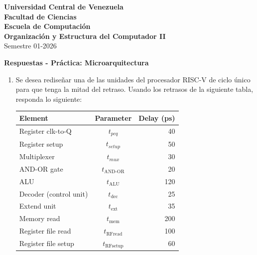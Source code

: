 \documentclass[letterpaper,12pt]{article}
\begin{document}

\noindent \textbf{Universidad Central de Venezuela}\\
\textbf{Facultad de Ciencias}\\
\textbf{Escuela de Computación}\\
\textbf{Organización y Estructura del Computador II}\\
Semestre 01-2026

\vspace{0.3cm}
\begin{center}
{\textbf{Respuestas - Práctica: Microarquitectura}}
\end{center}
\vspace{0.5cm}


\begin{enumerate}

    \item Se desea rediseñar una de las unidades del procesador RISC-V de ciclo único para que tenga la mitad del retraso. Usando los retrasos de la siguiente tabla, responda lo siguiente:

    \begin{center}
        \small
        \begin{tabular}{|l|c|r|}
            \hline
            \textbf{Element} & \textbf{Parameter} & \textbf{Delay (ps)} \\
            \hline
            Register clk-to-Q & $t_{pcq}$ & 40 \\
            Register setup & $t_{setup}$ & 50 \\
            Multiplexer & $t_{mux}$ & 30 \\
            AND-OR gate & $t_{\text{AND-OR}}$ & 20 \\
            ALU & $t_{\text{ALU}}$ & 120 \\
            Decoder (control unit) & $t_{\text{dec}}$ & 25 \\
            Extend unit & $t_{\text{ext}}$ & 35 \\
            Memory read & $t_{\text{mem}}$ & 200 \\
            Register file read & $t_{\text{RFread}}$ & 100 \\
            Register file setup & $t_{\text{RFsetup}}$ & 60 \\
            \hline
        \end{tabular}
    \end{center}


\end{enumerate}
\end{document}

